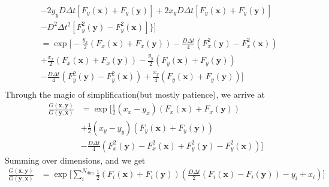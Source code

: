 \documentclass[11pt]{article}
\begin{document}
\begin{align*}
	&- 2y_y D \Delta t \left[ F_y(\mathbf{x}) + F_y(\mathbf{y}) \right] + 2 x_y D \Delta t \left[ F_y(\mathbf{x}) + F_y(\mathbf{y}) \right] \\
	&- D^2 \Delta t^2 \left[ F_y^2(\mathbf{y}) - F_y^2 (\mathbf{x}) \right] \Big\} \bigg] \\
	&= \exp \bigg[ - \frac{y_x}{2}\left( F_x(\mathbf{x}) + F_x(\mathbf{y})\right) - \frac{D \Delta t}{4} \left( F_x^2(\mathbf{y}) - F_x^2(\mathbf{x}) \right) \\
	&+ \frac{x_x}{2}\left(F_x(\mathbf{x}) + F_x (\mathbf{y})\right) - \frac{y_y}{2}\left(F_y(\mathbf{x}) + F_y(\mathbf{y})\right) \\
	&- \frac{D \Delta t}{4} \left(F^2_y(\mathbf{y}) - F_y^2(\mathbf{x})\right) + \frac{x_y}{4}\left( F_y(\mathbf{x}) + F_y (\mathbf{y}) \right)\bigg] \\
\end{align*}
Through the magic of simplification(but mostly patience), we arrive at
\begin{align*}
	\frac{G(\mathbf{x},\mathbf{y})}{G(\mathbf{y},\mathbf{x})} &= \exp\bigg[ \frac{1}{2}(x_x-y_x)\left(F_x(\mathbf{x}) + F_x(\mathbf{y})\right) \\
	&+ \frac{1}{2}\left(x_y - y_y\right)\left( F_y(\mathbf{x}) + F_y(\mathbf{y})\right) \\
	&- \frac{D\Delta t}{4}\left( F^2_x(\mathbf{y}) - F_x^2(\mathbf{x}) + F_y^2(\mathbf{y}) - F_y^2(\mathbf{x}) \right)\bigg]
\end{align*}
Summing over dimensions, and we get
\begin{align}
	\frac{G(\mathbf{x},\mathbf{y})}{G(\mathbf{y},\mathbf{x})} &= \exp\Bigg[ \sum_i^{N_\text{dim}} \frac{1}{2}\left( F_i(\mathbf{x}) + F_i(\mathbf{y}) \right) \left( \frac{D \Delta t}{2}\left(F_i(\mathbf{x}) - F_i(\mathbf{y})\right) - y_i + x_i \right) \Bigg]
	\label{eq:greens-ratio}
\end{align}
\end{document}
